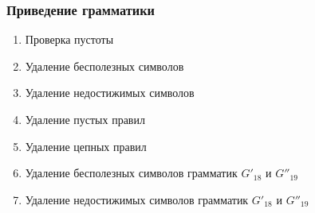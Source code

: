 \subsubsection{Приведение грамматики}
\begin{enumerate}
	\item Проверка пустоты
	      
	\item Удаление бесполезных символов
	      
	\item Удаление недостижимых символов
	      
	\item Удаление пустых правил
	      
	\item Удаление цепных правил
	      
	\item Удаление бесполезных символов грамматик \(G'_{18}\) и \(G''_{19}\)
	      
	\item Удаление недостижимых символов грамматик \(G'_{18}\) и \(G''_{19}\)
	      
\end{enumerate}
